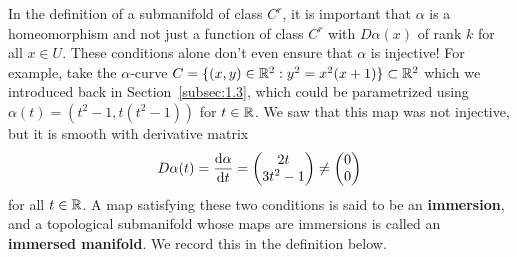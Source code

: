 In the definition of a submanifold of class $C^r$, it is important that 
$\alpha$ is a homeomorphism and not just a function of class $C^r$ 
with $D\alpha(x)$ of rank $k$ for all $x \in U$. These conditions alone
don't even ensure that $\alpha$ is injective! For example, take the 
$\alpha$-curve $C = \{(x, y) \in \mathbb{R}^2 : y^2 = x^2(x+1)\} \subset \mathbb{R}^2$ 
which we introduced back in Section~\ref{subsec:1.3}, which could be 
parametrized using $\alpha(t) = (t^2 - 1, t(t^2-1))$ for $t \in \mathbb{R}$. 
We saw that this map was not injective, but it is smooth with derivative matrix 
\[ D\alpha(t) = \frac{{\rm d}\alpha}{{\rm d}t} = \begin{pmatrix} 2t \\ 3t^2 - 1 \end{pmatrix} 
\neq \begin{pmatrix} 0 \\ 0 \end{pmatrix} \] 
for all $t \in \mathbb{R}$. A map satisfying these two conditions is said to be 
an {\bf immersion}, and a topological submanifold whose maps 
are immersions is called an {\bf immersed manifold}. We record this in 
the definition below. 

